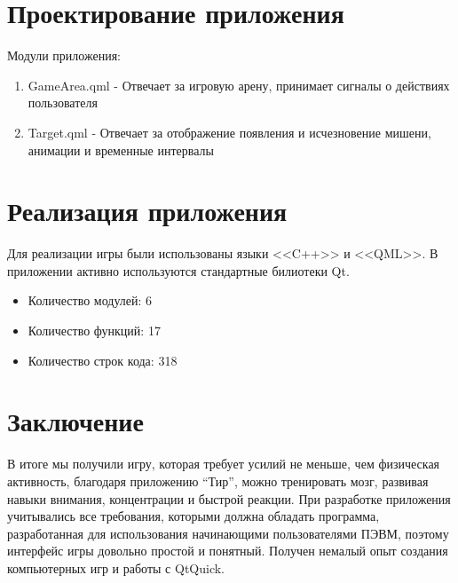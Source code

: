 \documentclass[a4paper,12pt]{article}
\begin{document}

\section{Проектирование приложения}

Модули приложения:

\begin{enumerate}
    \item GameArea.qml - Отвечает за игровую арену, принимает сигналы о действиях пользователя
    \item Target.qml - Отвечает за отображение появления и исчезновение мишени, анимации и временные интервалы
   
\end{enumerate}


\section{Реализация приложения}

Для реализации игры были использованы языки <<C++>> и <<QML>>. В приложении активно используются стандартные билиотеки Qt.
\begin{itemize}
    \item Количество модулей: 6
    \item Количество функций: 17
    \item Количество строк кода: 318
\end{itemize}



\newpage
\section*{Заключение}
В итоге мы получили игру, которая требует усилий не меньше, чем физическая активность, благодаря приложению “Тир”,  можно тренировать мозг, развивая навыки внимания, концентрации и быстрой реакции. При разработке приложения учитывались все требования, которыми должна обладать программа, разработанная для использования начинающими пользователями ПЭВМ, поэтому интерфейс игры довольно простой и понятный.  Получен немалый опыт создания компьютерных игр и работы с QtQuick. 
\end{document}
